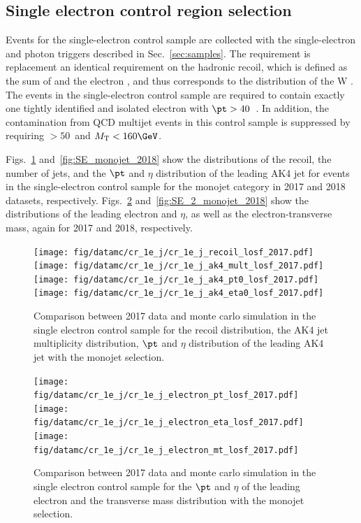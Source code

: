 {\newpage

\subsection{Single electron control region selection}
\label{sec:selection_cr_1e}
Events for the single-electron control sample are collected with the single-electron and photon triggers described in Sec.~\ref{sec:samples}.  The \ptmiss requirement is replacement an identical requirement on the hadronic recoil, which is defined as the sum of \ptvecmiss and the electron \vpt, and thus corresponds to the distribution of the W \pt.
The events in the single-electron control sample are required to contain exactly one tightly identified and isolated electron with $\pt > 40$~\GeV.
In addition, the contamination from QCD multijet events in this control sample is suppressed by requiring \MET$ > 50$~\GeV and $\mt < 160 \GeV$.

Figs.~\ref{fig:SE_monojet_2017} and~\ref{fig:SE_monojet_2018} show the distributions of the recoil, the number of jets, and the $\pt$ and $\eta$ distribution of the leading AK4  jet
for events in the single-electron control sample for the monojet category in 2017 and 2018 datasets, respectively. Figs.~\ref{fig:SE_2_monojet_2017} and~\ref{fig:SE_2_monojet_2018} show the distributions of the leading electron \pt and $\eta$, as well as the electron-\ptmiss transverse mass, again for 2017 and 2018, respectively.

\begin{figure}[htbp]
    \begin{center}
        \texttt{[image: fig/datamc/cr\_1e\_j/cr\_1e\_j\_recoil\_losf\_2017.pdf]}
        \texttt{[image: fig/datamc/cr\_1e\_j/cr\_1e\_j\_ak4\_mult\_losf\_2017.pdf]} \\
        \texttt{[image: fig/datamc/cr\_1e\_j/cr\_1e\_j\_ak4\_pt0\_losf\_2017.pdf]}
        \texttt{[image: fig/datamc/cr\_1e\_j/cr\_1e\_j\_ak4\_eta0\_losf\_2017.pdf]}
    \end{center}
    \caption{Comparison between 2017 data and monte carlo simulation in the single electron control sample for
        the recoil distribution, the AK4 jet multiplicity distribution,  $\pt$ and $\eta$ distribution
        of the leading AK4  jet with the monojet selection.}
    \label{fig:SE_monojet_2017}
\end{figure}

\begin{figure}[htbp]
    \begin{center}
        \texttt{[image: fig/datamc/cr\_1e\_j/cr\_1e\_j\_electron\_pt\_losf\_2017.pdf]}
        \texttt{[image: fig/datamc/cr\_1e\_j/cr\_1e\_j\_electron\_eta\_losf\_2017.pdf]} \\
        \texttt{[image: fig/datamc/cr\_1e\_j/cr\_1e\_j\_electron\_mt\_losf\_2017.pdf]}
    \end{center}
    \caption{Comparison between 2017 data and monte carlo simulation in the single electron control sample for
        the $\pt$ and $\eta$ of the leading electron and the transverse mass distribution with the monojet selection.}
    \label{fig:SE_2_monojet_2017}
\end{figure}

}
